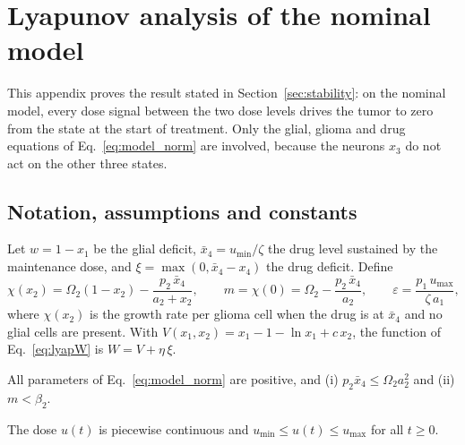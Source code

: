 
\section{Lyapunov analysis of the nominal model}
\label{app:lyapunov}

This appendix proves the result stated in Section~\ref{sec:stability}: on the nominal model, every dose signal between the two dose levels drives the tumor to zero from the state at the start of treatment. Only the glial, glioma and drug equations of Eq.~\eqref{eq:model_norm} are involved, because the neurons $x_3$ do not act on the other three states.

\subsection{Notation, assumptions and constants}

Let $w=1-x_1$ be the glial deficit, $\bar x_4=u_{\min}/\zeta$ the drug level sustained by the maintenance dose, and $\xi=\max(0,\bar x_4-x_4)$ the drug deficit. Define
\begin{equation}
\chi(x_2)=\Omega_2(1-x_2)-\frac{p_2\,\bar x_4}{a_2+x_2},\qquad
m=\chi(0)=\Omega_2-\frac{p_2\,\bar x_4}{a_2},\qquad
\varepsilon=\frac{p_1\,u_{\max}}{\zeta\,a_1},
\label{eq:lyap_defs}
\end{equation}
where $\chi(x_2)$ is the growth rate per glioma cell when the drug is at $\bar x_4$ and no glial cells are present. With $V(x_1,x_2)=x_1-1-\ln x_1+c\,x_2$, the function of Eq.~\eqref{eq:lyapW} is $W=V+\eta\,\xi$.

\begin{assumption}[Parameters]
\label{as:param}
All parameters of Eq.~\eqref{eq:model_norm} are positive, and (i) $p_2\bar x_4\le\Omega_2a_2^2$ and (ii) $m<\beta_2$.
\end{assumption}

\begin{assumption}[Dose]
\label{as:dose}
The dose $u(t)$ is piecewise continuous and $u_{\min}\le u(t)\le u_{\max}$ for all $t\ge0$.
\end{assumption}

